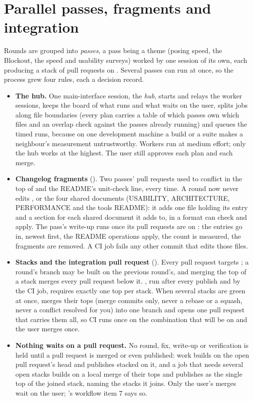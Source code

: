 \section{Parallel passes, fragments and integration}
Rounds are grouped into \emph{passes}, a pass being a theme (posing speed, the Blockout, the speed and usability
surveys) worked by one session of its own, each producing a stack of pull requests on . Several passes can run
at once, so the process grew four rules, each a decision record.
\begin{itemize}
  \item \textbf{The hub.} One main-interface session, the \emph{hub}, starts and relays the worker sessions, keeps the board
    of what runs and what waits on the user, splits jobs along file boundaries (every plan carries a table of which
    passes own which files and an overlap check against the passes already running) and queues the timed runs, because
    on one development machine a build or a suite makes a neighbour's measurement untrustworthy. Workers run at medium
    effort; only the hub works at the highest. The user still approves each plan and each merge.
  \item \textbf{Changelog fragments} (). Two passes' pull requests used to conflict in the top of
     and the README's unit-check line, every time. A round now never edits ,
     or the four shared documents (USABILITY, ARCHITECTURE, PERFORMANCE and the tools README): it adds
    one file  holding its entry and a section for each shared document it adds to, in
    a format  can check and apply. The pass's write-up runs  once
    its pull requests are on : the entries go in, newest first, the README operations apply, the count is
    measured, the fragments are removed. A  CI job fails any other commit that edits those files.
  \item \textbf{Stacks and the integration pull request} (). Every pull request targets ; a round's
    branch may be built on the previous round's, and merging the top of a stack merges every pull request below it.
    , run after every publish and by the  CI job, requires exactly one top
    per stack. When several stacks are green at once,  merges their tops (merge commits only,
    never a rebase or a squash, never a conflict resolved for you) into one  branch and opens one pull
    request that carries them all, so CI runs once on the combination that will be on  and the user merges once.
  \item \textbf{Nothing waits on a pull request.} No round, fix, write-up or verification is held until a pull request is
    merged or even published: work builds on the open pull request's head and publishes stacked on it, and a job that needs
    several open stacks builds on a local merge of their tops and publishes as the single top of the joined stack, naming
    the stacks it joins. Only the user's merges wait on the user; 's workflow item 7 says so.
\end{itemize}
